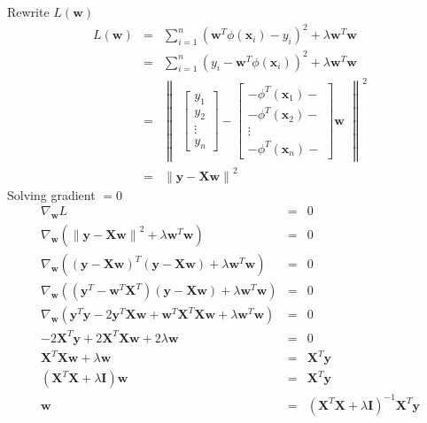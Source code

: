 \documentclass[12pt]{article}
\begin{document}
Rewrite $L(\textbf{w})$
\begin{eqnarray*}
  L(\textbf{w})
  &=& \sum_{i=1}^n (\textbf{w}^T \phi(\textbf{x}_i) - y_i)^2
  + \lambda \textbf{w}^T \textbf{w} \\
  &=& \sum_{i=1}^n (y_i - \textbf{w}^T \phi(\textbf{x}_i))^2
  + \lambda \textbf{w}^T \textbf{w} \\
  &=& \left\lVert 
  \begin{matrix}
    \begin{bmatrix}
      y_1 \\
      y_2 \\
      \vdots \\
      y_n
    \end{bmatrix}
    -
    \begin{bmatrix}
    - \phi^T(\textbf{x}_1)- \\
    - \phi^T(\textbf{x}_2)- \\
    \vdots \\
    -\phi^T(\textbf{x}_n)- 
    \end{bmatrix}
    \textbf{w}
  \end{matrix}
  \right\rVert^2 \\
  &=& \left\lVert \textbf{y} - \textbf{Xw} \right\rVert^2
\end{eqnarray*}
Solving gradient $=0$
\begin{eqnarray*}
  \nabla_{\textbf{w}} {L} &=& 0 \\
  \nabla_{\textbf{w}} {\left( 
      \left\lVert \textbf{y} - \textbf{Xw} \right\rVert^2 
      + \lambda \textbf{w}^T \textbf{w} \right)} &=& 0 \\
  \nabla_{\textbf{w}} {\left( \left(\textbf{y} - \textbf{Xw} \right)^T
      \left(\textbf{y} - \textbf{Xw} \right) 
      + \lambda \textbf{w}^T \textbf{w} \right)} &=& 0 \\
  \nabla_{\textbf{w}} {\left( 
      \left(\textbf{y}^T - \textbf{w}^T \textbf{X}^T \right)
      \left(\textbf{y} - \textbf{Xw} \right) 
      + \lambda \textbf{w}^T \textbf{w} \right)} &=& 0 \\
  \nabla_{\textbf{w}} {\left( 
      \textbf{y}^T \textbf{y} - 2 \textbf{y}^T \textbf{X} \textbf{w}
      + \textbf{w}^T \textbf{X}^T \textbf{Xw} 
      + \lambda \textbf{w}^T \textbf{w} \right)} &=& 0 \\
  - 2 \textbf{X}^T \textbf{y} + 2 \textbf{X}^T \textbf{Xw} 
  + 2 \lambda \textbf{w} &=& 0 \\
  \textbf{X}^T \textbf{Xw} + \lambda \textbf{w}
  &=& \textbf{X}^T \textbf{y} \\
  \left( \textbf{X}^T \textbf{X} + \lambda \textbf{I} \right) \textbf{w}
  &=& \textbf{X}^T \textbf{y} \\
  \textbf{w} &=&
  \left( \textbf{X}^T \textbf{X} + \lambda \textbf{I} \right)^{-1}
  \textbf{X}^T \textbf{y}
\end{eqnarray*}
\end{document}
